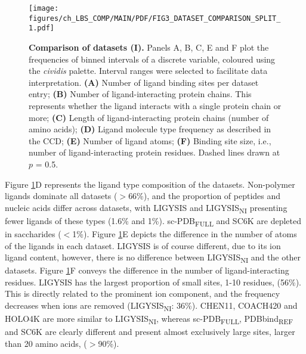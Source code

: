 \begin{figure}[ht!]
    \centering
    \texttt{[image: figures/ch\_LBS\_COMP/MAIN/PDF/FIG3\_DATASET\_COMPARISON\_SPLIT\_1.pdf]}
    \caption[Comparison of datasets (I)]{\textbf{Comparison of datasets (I).} Panels A, B, C, E and F plot the frequencies of binned intervals of a discrete variable, coloured using the \textit{cividis} palette. Interval ranges were selected to facilitate data interpretation. \textbf{(A)} Number of ligand binding sites per dataset entry; \textbf{(B)} Number of ligand-interacting protein chains. This represents whether the ligand interacts with a single protein chain or more; \textbf{(C)} Length of ligand-interacting protein chains (number of amino acids); \textbf{(D)} Ligand molecule type frequency as described in the CCD; \textbf{(E)} Number of ligand atoms; \textbf{(F)} Binding site size, i.e., number of ligand-interacting protein residues. Dashed lines drawn at $p$ = 0.5.}
    \label{fig:dataset_comp_1}
\end{figure}

Figure \ref{fig:dataset_comp_1}D represents the ligand type composition of the datasets. Non-polymer ligands dominate all datasets ($>$66\%), and the proportion of peptides and nucleic acids differ across datasets, with LIGYSIS and LIGYSIS\textsubscript{NI} presenting fewer ligands of these types (1.6\% and 1\%). sc-PDB\textsubscript{FULL} and SC6K are depleted in saccharides ($<$1\%). Figure \ref{fig:dataset_comp_1}E depicts the difference in the number of atoms of the ligands in each dataset. LIGYSIS is of course different, due to its ion ligand content, however, there is no difference between LIGYSIS\textsubscript{NI} and the other datasets. Figure \ref{fig:dataset_comp_1}F conveys the difference in the number of ligand-interacting residues. LIGYSIS has the largest proportion of small sites, 1-10 residues, (56\%). This is directly related to the prominent ion component, and the frequency decreases when ions are removed (LIGYSIS\textsubscript{NI}: 36\%). CHEN11, COACH420 and HOLO4K are more similar to LIGYSIS\textsubscript{NI}, whereas sc-PDB\textsubscript{FULL}, PDBbind\textsubscript{REF} and SC6K are clearly different and present almost exclusively large sites, larger than 20 amino acids, ($>$90\%).


